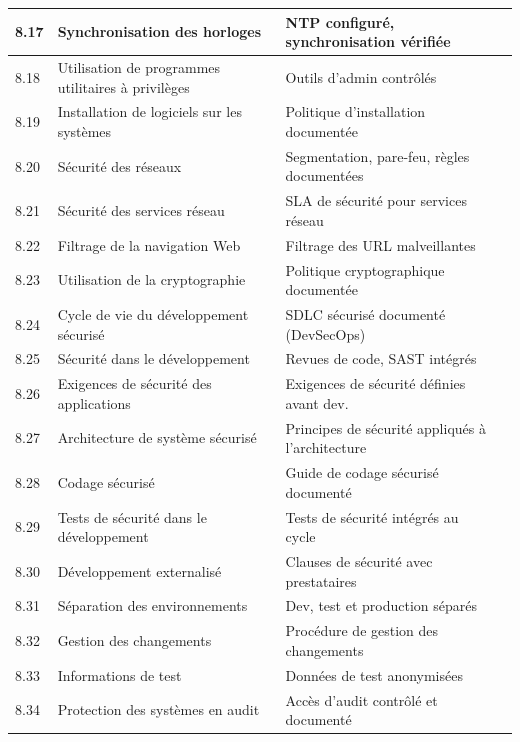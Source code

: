 \documentclass[12pt,a4paper,oneside]{report}
\begin{document}
\begin{longtable}{|p{1.5cm}|p{6.5cm}|p{4.5cm}|p{1cm}|}
\hline\rowcolor{trow1}
8.17 & Synchronisation des horloges &
  NTP configuré, synchronisation vérifiée & \\
\hline\rowcolor{trow2}
8.18 & Utilisation de programmes utilitaires à privilèges &
  Outils d'admin contrôlés & \\
\hline\rowcolor{trow1}
8.19 & Installation de logiciels sur les systèmes &
  Politique d'installation documentée & \\
\hline\rowcolor{trow2}
8.20 & Sécurité des réseaux &
  Segmentation, pare-feu, règles documentées & \\
\hline\rowcolor{trow1}
8.21 & Sécurité des services réseau &
  SLA de sécurité pour services réseau & \\
\hline\rowcolor{trow2}
8.22 & Filtrage de la navigation Web &
  Filtrage des URL malveillantes & \\
\hline\rowcolor{trow1}
8.23 & Utilisation de la cryptographie &
  Politique cryptographique documentée & \\
\hline\rowcolor{trow2}
8.24 & Cycle de vie du développement sécurisé &
  SDLC sécurisé documenté (DevSecOps) & \\
\hline\rowcolor{trow1}
8.25 & Sécurité dans le développement &
  Revues de code, SAST intégrés & \\
\hline\rowcolor{trow2}
8.26 & Exigences de sécurité des applications &
  Exigences de sécurité définies avant dev. & \\
\hline\rowcolor{trow1}
8.27 & Architecture de système sécurisé &
  Principes de sécurité appliqués à l'architecture & \\
\hline\rowcolor{trow2}
8.28 & Codage sécurisé &
  Guide de codage sécurisé documenté & \\
\hline\rowcolor{trow1}
8.29 & Tests de sécurité dans le développement &
  Tests de sécurité intégrés au cycle & \\
\hline\rowcolor{trow2}
8.30 & Développement externalisé &
  Clauses de sécurité avec prestataires & \\
\hline\rowcolor{trow1}
8.31 & Séparation des environnements &
  Dev, test et production séparés & \\
\hline\rowcolor{trow2}
8.32 & Gestion des changements &
  Procédure de gestion des changements & \\
\hline\rowcolor{trow1}
8.33 & Informations de test &
  Données de test anonymisées & \\
\hline\rowcolor{trow2}
8.34 & Protection des systèmes en audit &
  Accès d'audit contrôlé et documenté & \\
\hline
\end{longtable}
\end{document}
